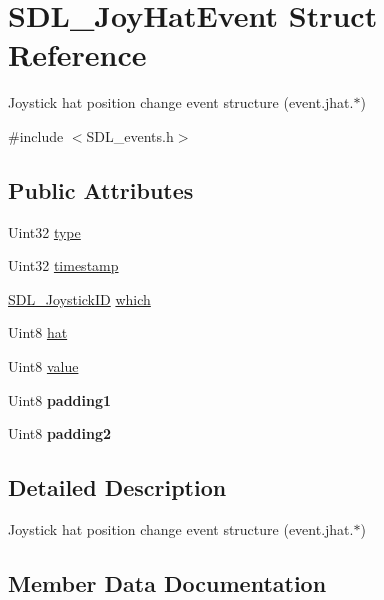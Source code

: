 \hypertarget{struct_s_d_l___joy_hat_event}{}\section{S\+D\+L\+\_\+\+Joy\+Hat\+Event Struct Reference}
\label{struct_s_d_l___joy_hat_event}


Joystick hat position change event structure (event.\+jhat.$\ast$)  




{\ttfamily \#include $<$S\+D\+L\+\_\+events.\+h$>$}

\subsection*{Public Attributes}
\begin{DoxyCompactItemize}
\item 
Uint32 \mbox{\hyperlink{struct_s_d_l___joy_hat_event_ac583dafab46c44354e210a542aff57cc}{type}}
\item 
Uint32 \mbox{\hyperlink{struct_s_d_l___joy_hat_event_ade58ecb3e75aad4ef9809f040519a021}{timestamp}}
\item 
\mbox{\hyperlink{_s_d_l__joystick_8h_a3c3d32500cb08f76ee8077983912c0bd}{S\+D\+L\+\_\+\+Joystick\+ID}} \mbox{\hyperlink{struct_s_d_l___joy_hat_event_ac9d9bb179f9116d16b3da47cacd74b55}{which}}
\item 
Uint8 \mbox{\hyperlink{struct_s_d_l___joy_hat_event_ab1b54a6d1091e583e856f86b5af1e2f6}{hat}}
\item 
Uint8 \mbox{\hyperlink{struct_s_d_l___joy_hat_event_a52b179a34407449941b61d988ca72ef4}{value}}
\item 
\mbox{\label{struct_s_d_l___joy_hat_event_afbe72b6702cf7f70ccbe206737ab2e49}} 
Uint8 {\bfseries padding1}
\item 
\mbox{\label{struct_s_d_l___joy_hat_event_adaca3e99773130ae456690ba83feb420}} 
Uint8 {\bfseries padding2}
\end{DoxyCompactItemize}


\subsection{Detailed Description}
Joystick hat position change event structure (event.\+jhat.$\ast$) 

\subsection{Member Data Documentation}
\mbox{\label{struct_s_d_l___joy_hat_event_ab1b54a6d1091e583e856f86b5af1e2f6}} 
